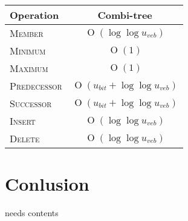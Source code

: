 \documentclass[oneside,11pt,openright]{report}
\newcommand{\BigO}[1]{\ensuremath{\operatorname{O}\left(#1\right)}}
\newcommand{\Insert}{\textsc{Insert}}
\newcommand{\Delete}{\textsc{Delete}}
\newcommand{\Member}{\textsc{Member}}
\newcommand{\Minimum}{\textsc{Minimum}}
\newcommand{\Maximum}{\textsc{Maximum}}
\newcommand{\Predecessor}{\textsc{Predecessor}}
\newcommand{\Successor}{\textsc{Successor}}
\begin{document}
\begin{center}
  \begin{tabular}{ l | c }
    Operation & Combi-tree  \\ \hline
    \Member & $\BigO{ \log \log u_{veb} }$ \\ 
    \Minimum & $\BigO{1}$ \\ 
    \Maximum & $\BigO{1}$ \\ 
    \Predecessor & $\BigO{ u_{bit} + \log \log u_{veb} }$ \\ 
    \Successor & $\BigO{ u_{bit} + \log \log u_{veb} }$ \\ 
    \Insert & $\BigO{\log \log u_{veb} }$ \\ 
    \Delete & $\BigO{\log \log u_{veb} }$ \\
  \end{tabular}
\end{center}



\chapter{Conlusion}

needs contents



 

\end{document}
